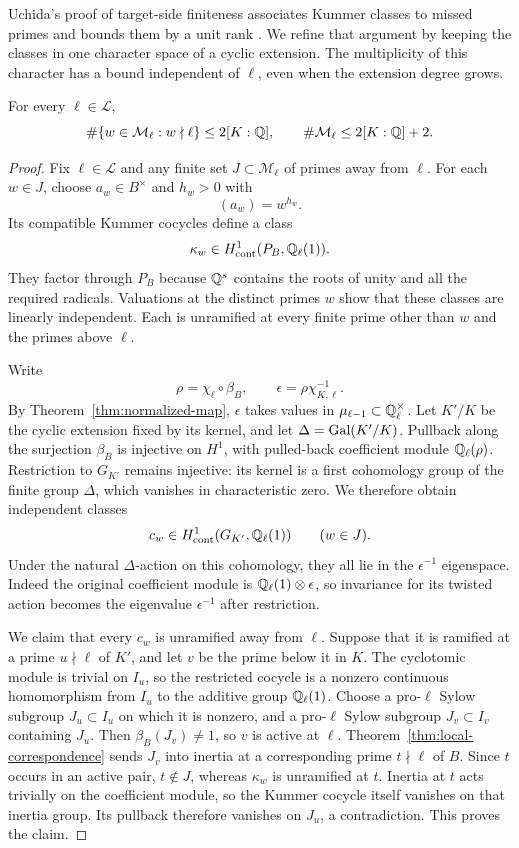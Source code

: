 Uchida's proof of target-side finiteness associates Kummer classes to missed primes and bounds them by a unit rank \cite[Proposition~1]{uchida1981}. We refine that argument by keeping the classes in one character space of a cyclic extension. The multiplicity of this character has a bound independent of $\ell$, even when the extension degree grows.

\begin{proposition}\label{prop:uniform-missed-primes}
For every $\ell\in\mathcal L$,
\[
 \#\{w\in\mathcal M_\ell:w\nmid\ell\}\le 2[K:\mathbb Q],
 \qquad
 \#\mathcal M_\ell\le 2[K:\mathbb Q]+2.
\]
\end{proposition}
\begin{proof}
Fix $\ell\in\mathcal L$ and any finite set $J\subset\mathcal M_\ell$ of primes away from $\ell$. For each $w\in J$, choose $a_w\in B^\times$ and $h_w>0$ with
\[
 (a_w)=w^{h_w}.
\]
Its compatible Kummer cocycles define a class
\[
 \kappa_w\in H^1_{\mathrm{cont}}(P_B,\mathbb Q_\ell(1)).
\]
They factor through $P_B$ because $\mathbb Q^s$ contains the roots of unity and all the required radicals. Valuations at the distinct primes $w$ show that these classes are linearly independent. Each is unramified at every finite prime other than $w$ and the primes above $\ell$.

Write
\[
 \rho=\chi_\ell\circ\beta_B,\qquad
 \epsilon=\rho\chi_{K,\ell}^{-1}.
\]
By Theorem~\ref{thm:normalized-map}, $\epsilon$ takes values in $\mu_{\ell-1}\subset\mathbb Q_\ell^\times$. Let $K'/K$ be the cyclic extension fixed by its kernel, and let $\Delta=\operatorname{Gal}(K'/K)$. Pullback along the surjection $\beta_B$ is injective on $H^1$, with pulled-back coefficient module $\mathbb Q_\ell(\rho)$. Restriction to $G_{K'}$ remains injective: its kernel is a first cohomology group of the finite group $\Delta$, which vanishes in characteristic zero. We therefore obtain independent classes
\[
 c_w\in H^1_{\mathrm{cont}}(G_{K'},\mathbb Q_\ell(1))
 \qquad(w\in J).
\]
Under the natural $\Delta$-action on this cohomology, they all lie in the $\epsilon^{-1}$ eigenspace. Indeed the original coefficient module is $\mathbb Q_\ell(1)\otimes\epsilon$, so invariance for its twisted action becomes the eigenvalue $\epsilon^{-1}$ after restriction.

We claim that every $c_w$ is unramified away from $\ell$. Suppose that it is ramified at a prime $u\nmid\ell$ of $K'$, and let $v$ be the prime below it in $K$. The cyclotomic module is trivial on $I_u$, so the restricted cocycle is a nonzero continuous homomorphism from $I_u$ to the additive group $\mathbb Q_\ell(1)$. Choose a pro-$\ell$ Sylow subgroup $J_u\subset I_u$ on which it is nonzero, and a pro-$\ell$ Sylow subgroup $J_v\subset I_v$ containing $J_u$. Then $\beta_B(J_v)\ne1$, so $v$ is active at $\ell$. Theorem~\ref{thm:local-correspondence} sends $J_v$ into inertia at a corresponding prime $t\nmid\ell$ of $B$. Since $t$ occurs in an active pair, $t\notin J$, whereas $\kappa_w$ is unramified at $t$. Inertia at $t$ acts trivially on the coefficient module, so the Kummer cocycle itself vanishes on that inertia group. Its pullback therefore vanishes on $J_u$, a contradiction. This proves the claim.


\end{proof}
